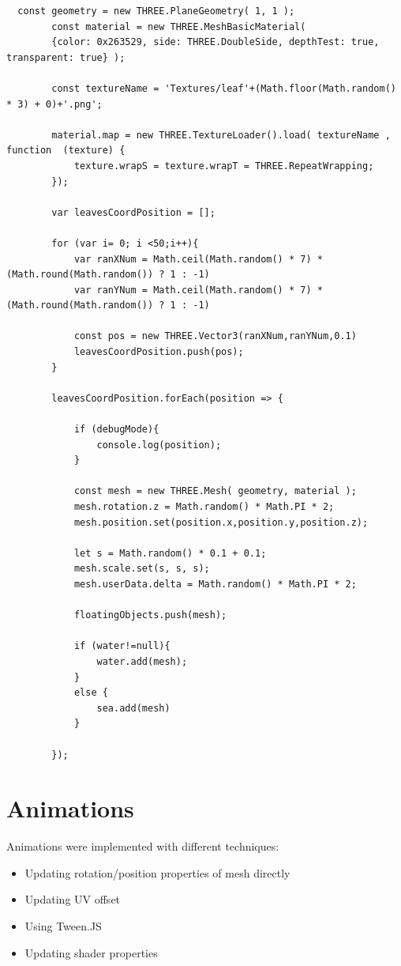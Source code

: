 \documentclass[10pt,a4paper]{article}
\begin{document}
\begin{verbatim}
  const geometry = new THREE.PlaneGeometry( 1, 1 );
        const material = new THREE.MeshBasicMaterial( 
        {color: 0x263529, side: THREE.DoubleSide, depthTest: true, transparent: true} );

        const textureName = 'Textures/leaf'+(Math.floor(Math.random() * 3) + 0)+'.png';

        material.map = new THREE.TextureLoader().load( textureName , function  (texture) {
            texture.wrapS = texture.wrapT = THREE.RepeatWrapping;
        });
        
        var leavesCoordPosition = [];

        for (var i= 0; i <50;i++){
            var ranXNum = Math.ceil(Math.random() * 7) * (Math.round(Math.random()) ? 1 : -1)
            var ranYNum = Math.ceil(Math.random() * 7) * (Math.round(Math.random()) ? 1 : -1)

            const pos = new THREE.Vector3(ranXNum,ranYNum,0.1)
            leavesCoordPosition.push(pos);     
        }
    
        leavesCoordPosition.forEach(position => {

            if (debugMode){
                console.log(position);
            }
       
            const mesh = new THREE.Mesh( geometry, material );
            mesh.rotation.z = Math.random() * Math.PI * 2; 
            mesh.position.set(position.x,position.y,position.z);
          
            let s = Math.random() * 0.1 + 0.1;
            mesh.scale.set(s, s, s);
            mesh.userData.delta = Math.random() * Math.PI * 2;

            floatingObjects.push(mesh);
        
            if (water!=null){
                water.add(mesh);
            }
            else {
                sea.add(mesh)
            }

        });
\end{verbatim}

\section{Animations}

Animations were implemented with different techniques:

\begin{itemize}
 \item Updating rotation/position properties of mesh directly
 \item Updating UV offset
 \item Using Tween.JS
 \item Updating shader properties
\end{itemize}
\end{document}
